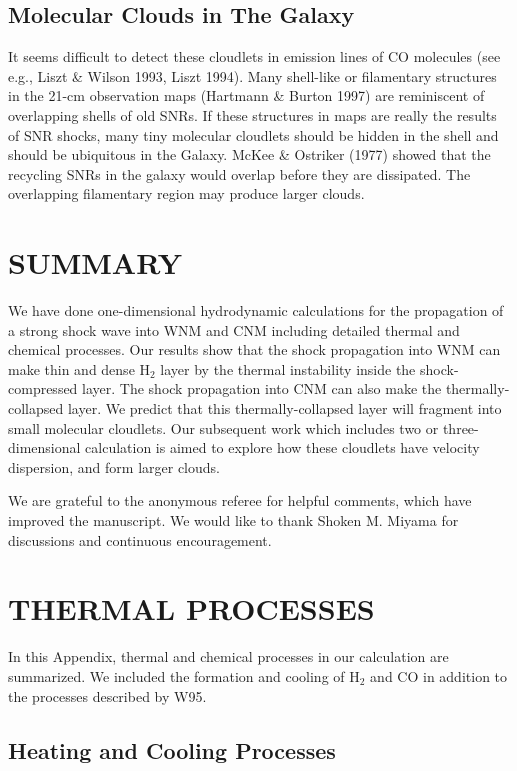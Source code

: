 \subsection{Molecular Clouds in The Galaxy}

It seems difficult to detect these cloudlets in emission lines 
of CO molecules (see e.g., Liszt \& Wilson 1993, Liszt 1994). 
Many shell-like or filamentary structures in the  21-cm 
observation maps 
(Hartmann \& Burton 1997)
are reminiscent of overlapping shells of old SNRs. 
If these structures in  maps are really the 
results of SNR shocks,  
many tiny molecular cloudlets should be hidden in the shell 
and should be ubiquitous in the Galaxy. 
McKee \& Ostriker (1977) showed that the recycling SNRs in the 
galaxy would overlap before they are dissipated.
The overlapping filamentary region may produce larger clouds. 


\section{SUMMARY}

We have done one-dimensional hydrodynamic calculations
for the propagation of a strong shock wave into WNM and CNM
including detailed thermal and chemical processes. 
Our results show that the shock propagation into WNM can make thin and
dense H$_2$ layer by the thermal instability inside the
shock-compressed layer.
The shock propagation into CNM can also make the thermally-collapsed layer.
We predict that this thermally-collapsed layer will fragment
into small molecular cloudlets.
Our subsequent work which includes two or three-dimensional
calculation is aimed to explore 
how these cloudlets have velocity dispersion, and form larger clouds.

\acknowledgments
We are grateful to the anonymous referee for helpful comments, 
which have improved the manuscript.
We would like to thank Shoken M. Miyama for discussions and 
continuous encouragement.

\appendix
\section{THERMAL PROCESSES}\label{THERMAL}
In this Appendix, thermal and chemical processes in our
calculation are summarized.
We included the formation and cooling of H$_2$ and CO in addition to the 
processes described by W95.

\subsection{Heating and Cooling Processes}
